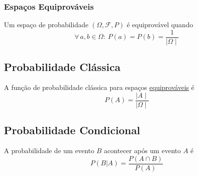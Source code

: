 \documentclass{article}
\begin{document}
\subsubsection{Espaços Equiprováveis}
Um espaço de probabilidade $(\Omega, \mathcal{F}, P)$ é equiprovável quando
\[ \forall \, a, b \in \Omega: \> P({a}) = P({b}) = \frac{1}{\mid \Omega \mid} \]


\subsection{Probabilidade Clássica}
A função de probabilidade clássica para espaços \uline{equiprováveis} é
\[ P(A) = \frac{\mid A \mid}{\mid \Omega \mid} \]


\subsection{Probabilidade Condicional}
A probabilidade de um evento $B$ acontecer após um evento $A$ é
\[ P(B|A) = \frac{P(A \cap B)}{P(A)} \]
\end{document}
